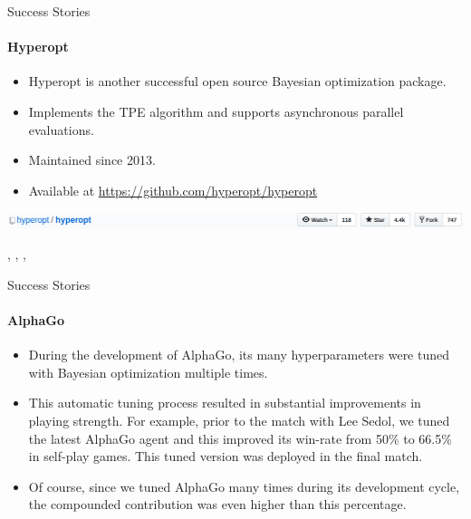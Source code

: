 \begin{frame}[c]{Success Stories}
\framesubtitle{Hyperopt}
\begin{itemize}
    \item Hyperopt is another successful open source Bayesian optimization package.
    \item Implements the TPE algorithm and supports asynchronous parallel evaluations.
    \item Maintained since 2013.
    \item Available at \url{https://github.com/hyperopt/hyperopt}
\end{itemize}
\vspace{1cm}
\includegraphics[width=\linewidth, height=\textheight, keepaspectratio=true]{w07_hpo_grey_box/images/success_stories/hyperopt_git_stats.png}

\vspace{1cm}
\hspace{2cm}
, , , 

\end{frame}

\begin{frame}[c]{Success Stories}
\framesubtitle{AlphaGo}
\begin{itemize}
    \item During the development of AlphaGo, its many hyperparameters
were tuned with Bayesian optimization multiple times.
    \item This automatic tuning process resulted in substantial improvements in playing strength. For example, prior to the match with Lee Sedol, we tuned the latest AlphaGo agent and this improved its win-rate from 50\% to 66.5\% in self-play games. This tuned version was deployed in the final match.
    \item Of course, since we tuned AlphaGo many times during its development cycle, the compounded contribution was even higher than this percentage.
\end{itemize}
\vspace{1cm}
\hspace{12cm}
\end{frame}

